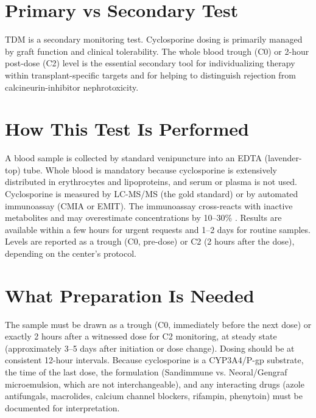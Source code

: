 \section*{Primary vs Secondary Test}
TDM is a secondary monitoring test. Cyclosporine dosing is primarily managed by graft function and clinical tolerability. The whole blood trough (C0) or 2-hour post-dose (C2) level is the essential secondary tool for individualizing therapy within transplant-specific targets and for helping to distinguish rejection from calcineurin-inhibitor nephrotoxicity.

\section*{How This Test Is Performed}
A blood sample is collected by standard venipuncture into an EDTA (lavender-top) tube. Whole blood is mandatory because cyclosporine is extensively distributed in erythrocytes and lipoproteins, and serum or plasma is not used. Cyclosporine is measured by LC-MS/MS (the gold standard) or by automated immunoassay (CMIA or EMIT). The immunoassay cross-reacts with inactive metabolites and may overestimate concentrations by 10--30\% \cite{rifai2018tietz}. Results are available within a few hours for urgent requests and 1--2 days for routine samples. Levels are reported as a trough (C0, pre-dose) or C2 (2 hours after the dose), depending on the center's protocol.

\section*{What Preparation Is Needed}
The sample must be drawn as a trough (C0, immediately before the next dose) or exactly 2 hours after a witnessed dose for C2 monitoring, at steady state (approximately 3--5 days after initiation or dose change). Dosing should be at consistent 12-hour intervals. Because cyclosporine is a CYP3A4/P-gp substrate, the time of the last dose, the formulation (Sandimmune vs. Neoral/Gengraf microemulsion, which are not interchangeable), and any interacting drugs (azole antifungals, macrolides, calcium channel blockers, rifampin, phenytoin) must be documented for interpretation.

